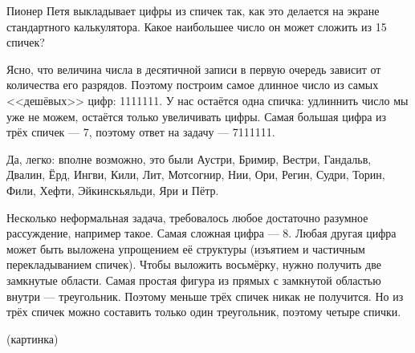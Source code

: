 \begin{itemize}
\itA Пионер Петя выкладывает цифры из спичек так, как это делается на экране стандартного калькулятора. Какое наибольшее число он может сложить из 15 спичек?

Ясно, что величина числа в десятичной записи в первую очередь зависит от 
количества его разрядов. Поэтому построим самое длинное число из самых
<<дешёвых>> цифр: 1111111. У нас остаётся одна спичка: удлиннить число мы
уже не можем, остаётся только увеличивать цифры. Самая большая цифра из трёх
спичек --- 7, поэтому ответ на задачу --- 7111111.

\itB Да, легко: вполне возможно, это были 
Аустри, Бримир, Вестри, Гандальв, Двалин, 
Ёрд, Ингви, Кили, Лит, Мотсогнир, 
Нии, Ори, Регин, Судри, Торин,
Фили, Хефти, Эйкинскьяльди, Яри
и Пётр.
                                                        
\itC Несколько неформальная задача, требовалось любое достаточно разумное 
рассуждение, например такое.
Самая сложная цифра --- 8. Любая другая цифра может быть выложена
упрощением её структуры (изъятием и частичным перекладыванием спичек).
Чтобы выложить восьмёрку, нужно получить две замкнутые области.
Самая простая фигура из прямых с замкнутой областью внутри --- треугольник.
Поэтому меньше трёх спичек никак не получится. Но из трёх спичек 
можно составить только один треугольник, поэтому четыре спички.

(картинка)
\end{itemize}
